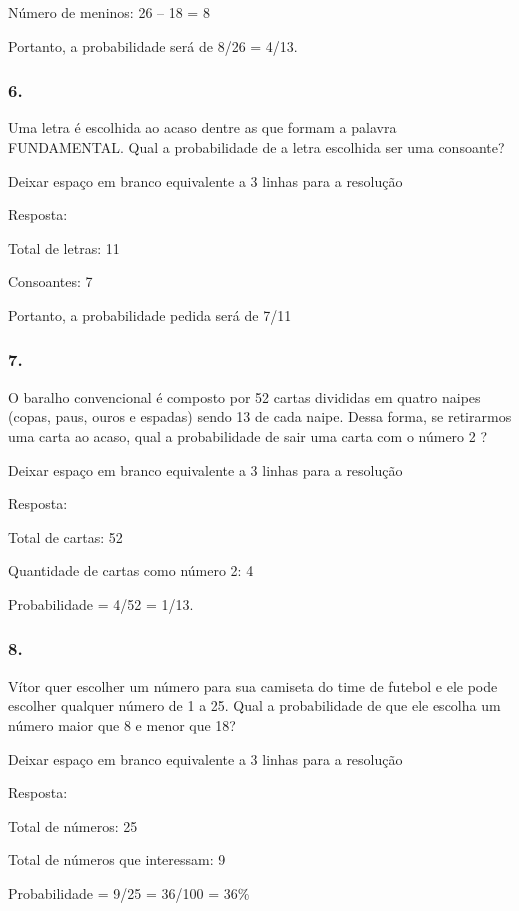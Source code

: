Número de meninos: 26 -- 18 = 8

Portanto, a probabilidade será de 8/26 = 4/13.

\subsubsection{6.}\label{section-83}

Uma letra é escolhida ao acaso dentre as que formam a palavra
FUNDAMENTAL. Qual a probabilidade de a letra escolhida ser uma
consoante?

Deixar espaço em branco equivalente a 3 linhas para a resolução

Resposta:

Total de letras: 11

Consoantes: 7

Portanto, a probabilidade pedida será de 7/11

\subsubsection{7.}\label{section-84}

O baralho convencional é composto por 52 cartas divididas em quatro
naipes (copas, paus, ouros e espadas) sendo 13 de cada naipe. Dessa
forma, se retirarmos uma carta ao acaso, qual a probabilidade de sair
uma carta com o número 2 ?

Deixar espaço em branco equivalente a 3 linhas para a resolução

Resposta:

Total de cartas: 52

Quantidade de cartas como número 2: 4

Probabilidade = 4/52 = 1/13.

\subsubsection{8.}\label{section-85}

Vítor quer escolher um número para sua camiseta do time de futebol e ele
pode escolher qualquer número de 1 a 25. Qual a probabilidade de que ele
escolha um número maior que 8 e menor que 18?

Deixar espaço em branco equivalente a 3 linhas para a resolução

Resposta:

Total de números: 25

Total de números que interessam: 9

Probabilidade = 9/25 = 36/100 = 36\%

